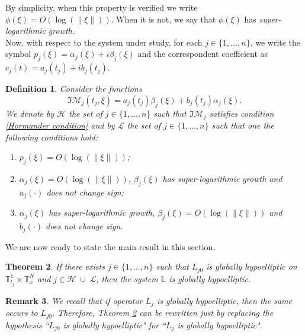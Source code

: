 \documentclass[12pt]{elsarticle}
\newtheorem{theorem}{Theorem}[section]
\newtheorem{remark}[theorem]{Remark}
\newtheorem{definition}[theorem]{Definition}
\numberwithin{equation}{section}
\begin{document}
By simplicity, when this property is verified we write $\phi(\xi) = O(\log(\|\xi\|))$. When it 
 is not, we say that $\phi(\xi)$ has \textit{super-logarithmic growth}.\\



Now, with respect to the system under study, for each $j\in\{1,\ldots,n\}$,  we write the symbol $p_j(\xi)=\alpha_j(\xi)+i\beta_j(\xi)$ and the correspondent coefficient as $c_j(t) = a_j(t_j) + i b_j(t_j)$. 



\begin{definition}\label{growth}
    Consider the functions 
	$$
	\Im \mathcal{M}_j(t_j,\xi)=a_j(t_j)\beta_j(\xi)+b_j(t_j)\alpha_j(\xi).
	$$
	We denote by $\mathcal{H}$ the set of $j\in \{1, \ldots, n\}$  such that 	$\Im \mathcal{M}_j$ satisfies condition \eqref{Hormander condition} and by $\mathcal{L}$  the set of $j\in \{1, \ldots, n\}$ such that one the following conditions hold:
	\begin{enumerate}
		\item [(i)] $p_j(\xi) = O(\log(\|\xi\|))$;
		
		\item [(ii)] $\alpha_j(\xi) = O(\log(\|\xi\|))$,  $\beta_j(\xi)$ has super-logarithmic growth and  $a_j(\cdot)$ does not change sign;
		
		\item [(iii)] $\alpha_j(\xi)$ has super-logarithmic growth, $\beta_j(\xi) = O(\log(\|\xi\|))$ and $b_j(\cdot)$ does not change sign.
	\end{enumerate}
\end{definition}


We are now ready to state the main result in this section.
\begin{theorem}\label{main-suff}
	If there exists $j\in\{1,\ldots,n\}$ such that $L_{j0}$ is globally hypoelliptic on $\mathbb{T}_{t_j}^{1}\times\mathbb{T}_x^{N}$ and $j\in \mathcal{H}\; {\cup} \;\mathcal{L}$, 	then the system $\mathbb{L}$ is globally hypoelliptic.
\end{theorem}


\begin{remark}
We recall that if  operator $L_j$ is globally hypoelliptic, then  the same occurs to $L_{j0}$. Therefore, Theorem \ref{main-suff} can be rewritten just by repla\-cing the hypothesis ``$L_{j0}$ is globally hypoelliptic" for  ``$L_{j}$ is globally hypoelliptic".
\end{remark}
\end{document}
